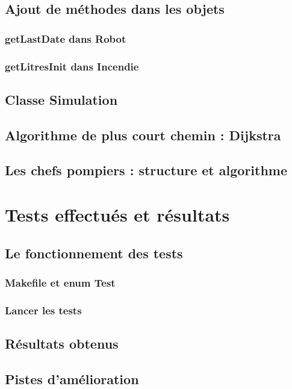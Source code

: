 \documentclass[a4paper,8pt]{article} %
\begin{document}
\subsection{Ajout de méthodes dans les objets}
\subsubsection{getLastDate dans Robot}
\subsubsection{getLitresInit dans Incendie}
\subsection{Classe Simulation}
\subsection{Algorithme de plus court chemin : Dijkstra}
\subsection{Les chefs pompiers : structure et algorithme}
\section{Tests effectués et résultats}
\subsection{Le fonctionnement des tests}
\subsubsection{Makefile et enum Test}
\subsubsection{Lancer les tests}
\subsection{Résultats obtenus}
\subsection{Pistes d'amélioration}
\end{document}
